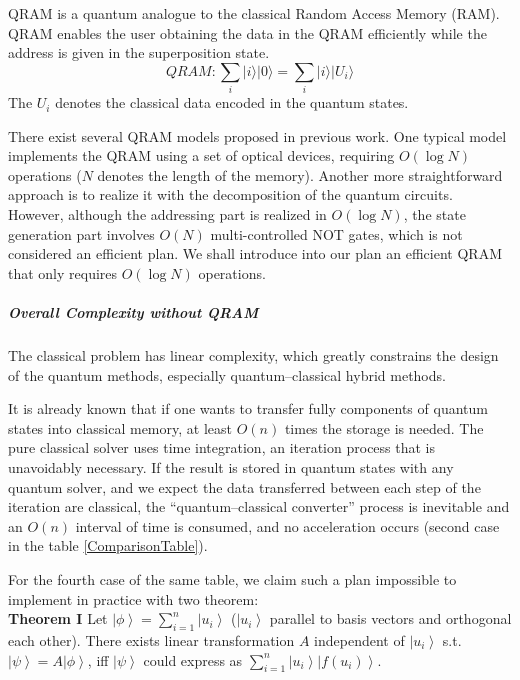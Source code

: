\documentclass[%
 reprint,
 amsmath,amssymb,
pra,
]{revtex4-1}
\begin{document}
QRAM is a quantum analogue to the classical Random Access Memory (RAM). QRAM enables the user obtaining the data in the QRAM efficiently while the address is given in the superposition state. 
\begin{equation}
QRAM: \sum_i{|i\rangle|0\rangle}=\sum_i{|i\rangle|U_i\rangle}
\end{equation}
The $U_i$ denotes the classical data encoded in the quantum states.

There exist several QRAM models proposed in previous work. One typical model implements the QRAM using a set of optical devices, requiring $O(\log N)$ operations ($N$ denotes the length of the memory). Another more straightforward approach is to realize it with the decomposition of the quantum circuits. However, although the addressing part is realized in $O(\log N)$, the state generation part involves $O(N)$ multi-controlled NOT gates, which is not considered an efficient plan.
We shall introduce into our plan an efficient QRAM that only requires $O(\log N)$ operations.

\subparagraph{Overall Complexity without QRAM} The classical problem has linear complexity, which greatly constrains the design of the quantum methods, especially quantum--classical hybrid methods. 

It is already known that if one wants to transfer fully components of quantum states into classical memory, at least $O(n)$ times the storage is needed. The pure classical solver uses time integration, an iteration process that is unavoidably necessary. If the result is stored in quantum states with any quantum solver, and we expect the data transferred between each step of the iteration are classical, the “quantum--classical converter” process is inevitable and an $O(n)$ interval of time is consumed, and no acceleration occurs (second case in the table \ref{ComparisonTable}).

For the fourth case of the same table, we claim such a plan impossible to implement in practice with two theorem:
~\\

\textbf{Theorem I} Let $\left|\phi\right\rangle = \sum_{i=1}^n \left|u_i\right\rangle$ ($\left|u_i\right\rangle$ parallel to basis vectors and orthogonal each other). There exists 
linear transformation $A$ independent of $\left|u_{i}\right\rangle$ s.t. $\left|\psi\right\rangle = A\left|\phi\right\rangle$, iff $\left|\psi\right\rangle$ could express as $\sum_{i=1}^{n}\left|u_i\right\rangle\left|f\left(u_i\right)\right\rangle$.
~\\
\end{document}
